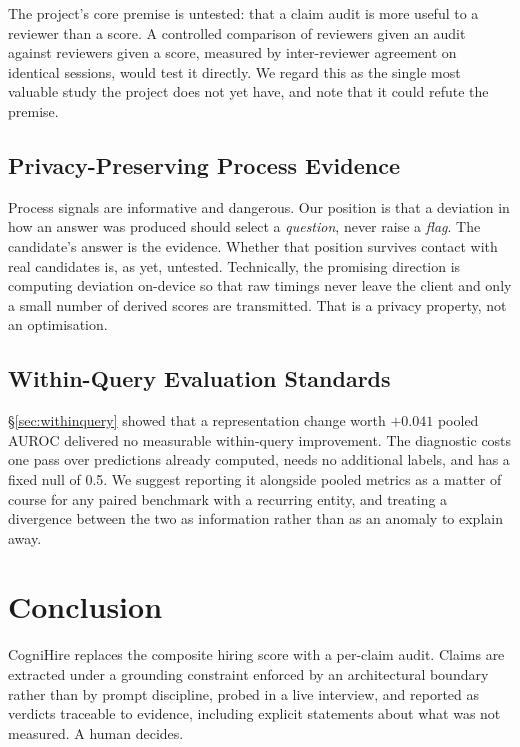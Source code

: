 The project's core premise is untested: that a claim audit is more useful to a reviewer than a score. A controlled comparison of reviewers given an audit against reviewers given a score, measured by inter-reviewer agreement on identical sessions, would test it directly. We regard this as the single most valuable study the project
does not yet have, and note that it could refute the premise.

\subsection{Privacy-Preserving Process Evidence}

Process signals are informative and dangerous. Our position is that a deviation
in how an answer was produced should select a \emph{question}, never raise a \emph{flag}. The candidate's answer is the evidence. Whether that position survives contact with real candidates is, as yet, untested. Technically, the promising direction is
computing deviation on-device so that raw timings never leave the client and only a small number of derived scores are transmitted. That is a privacy property, not an optimisation.

\subsection{Within-Query Evaluation Standards}

\S\ref{sec:withinquery} showed that a representation change worth $+0.041$ pooled
AUROC delivered no measurable within-query improvement. The diagnostic costs one
pass over predictions already computed, needs no additional labels, and has a
fixed null of 0.5. We suggest reporting it alongside pooled metrics as a matter
of course for any paired benchmark with a recurring entity, and treating a
divergence between the two as information rather than as an anomaly to explain
away.

\section{Conclusion}
\label{sec:conclusion}

CogniHire replaces the composite hiring score with a per-claim audit. Claims are
extracted under a grounding constraint enforced by an architectural boundary
rather than by prompt discipline, probed in a live interview, and reported as verdicts traceable to evidence, including explicit statements about what was not measured. A human decides.

